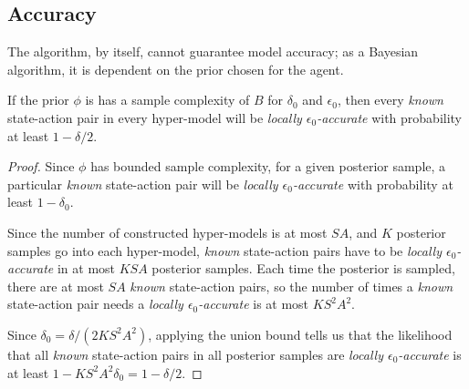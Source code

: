 



\subsection{Accuracy}

The  algorithm, by itself, cannot guarantee model accuracy; as a Bayesian algorithm, it is dependent on the prior chosen for the agent.

\begin{lemma}
\label{sec:boss:lemma:acc}
If the prior $\phi$ is has a sample complexity of $B$ for $\delta_0$ and $\epsilon_0$, then every \emph{known} state-action pair in every hyper-model will be \emph{locally $\epsilon_0$-accurate} with probability at least $1-\delta/2$.
\end{lemma}

\begin{proof}
Since $\phi$ has bounded sample complexity, for a given posterior sample, a particular \emph{known} state-action pair will be \emph{locally $\epsilon_0$-accurate} with probability at least $1-\delta_0$.

Since the number of constructed hyper-models is at most $S A$, and $K$ posterior samples go into each hyper-model, \emph{known} state-action pairs have to be \emph{locally $\epsilon_0$-accurate} in at most $K S A$ posterior samples. Each time the posterior is sampled, there are at most $S A$ \emph{known} state-action pairs, so the number of times a \emph{known} state-action pair needs a \emph{locally $\epsilon_0$-accurate} is at most $K S^2 A^2$.

Since $\delta_0 = \delta/(2KS^2A^2)$, applying the union bound tells us that the likelihood that all \emph{known} state-action pairs in all posterior samples are \emph{locally $\epsilon_0$-accurate} is at least $1-KS^2A^2\delta_0 = 1-\delta/2$.

\end{proof}

